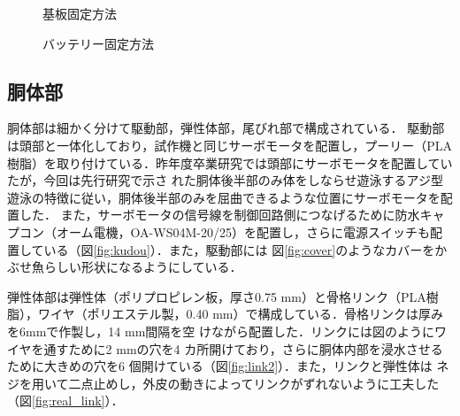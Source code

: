 \begin{figure}[t]
    \centering
    \begin{minipage}[b]{0.35\linewidth}
        \centering
        \caption{基板固定方法}
        \label{fig:toubu_kiban}
    \end{minipage}
    \hspace{0.05\linewidth}
    \begin{minipage}[b]{0.35\linewidth}
        \centering
        \caption{バッテリー固定方法}
        \label{fig:toubu_battery}
    \end{minipage}
\end{figure}

\subsection{胴体部}
胴体部は細かく分けて駆動部，弾性体部，尾びれ部で構成されている．
駆動部は頭部と一体化しており，試作機と同じサーボモータを配置し，プーリー（PLA樹脂）を取り付けている．昨年度卒業研究では頭部にサーボモータを配置していたが，今回は先行研究\cite{juu}で示さ
れた胴体後半部のみ体をしならせ遊泳するアジ型遊泳の特徴に従い，胴体後半部のみを屈曲できるような位置にサーボモータを配置した．
また，サーボモータの信号線を制御回路側につなげるために防水キャプコン（オーム電機，OA-WS04M-20/25）を配置し，さらに電源スイッチも配置している（図\ref{fig:kudou}）．また，駆動部には
図\ref{fig:cover}のようなカバーをかぶせ魚らしい形状になるようにしている．

弾性体部は弾性体（ポリプロピレン板，厚さ0.75 mm）と骨格リンク（PLA樹脂），ワイヤ（ポリエステル製，0.40 mm）で構成している．骨格リンクは厚みを6mmで作製し，14 mm間隔を空
けながら配置した．リンクには図のようにワイヤを通すために2 mmの穴を4 カ所開けており，さらに胴体内部を浸水させるために大きめの穴を6 個開けている（図\ref{fig:link2}）．また，リンクと弾性体は
ネジを用いて二点止めし，外皮の動きによってリンクがずれないように工夫した（図\ref{fig:real_link}）．

